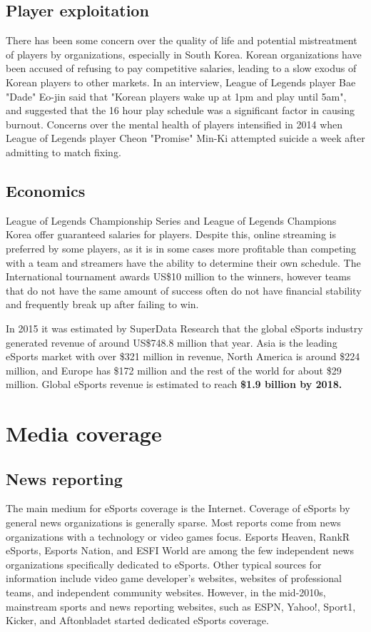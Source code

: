 	\subsection{Player exploitation}
	There has been some concern over the quality of life and potential mistreatment of players by organizations, especially in South Korea. Korean organizations have been accused of refusing to pay competitive salaries, leading to a slow exodus of Korean players to other markets. In an interview, League of Legends player Bae "Dade" Eo-jin said that "Korean players wake up at 1pm and play until 5am", and suggested that the 16 hour play schedule was a significant factor in causing burnout. Concerns over the mental health of players intensified in 2014 when League of Legends player Cheon "Promise" Min-Ki attempted suicide a week after admitting to match fixing.
	\subsection{Economics}
	League of Legends Championship Series and League of Legends Champions Korea offer guaranteed salaries for players. Despite this, online streaming is preferred by some players, as it is in some cases more profitable than competing with a team and streamers have the ability to determine their own schedule. The International tournament awards US\$10 million to the winners, however teams that do not have the same amount of success often do not have financial stability and frequently break up after failing to win.
	
	In 2015 it was estimated by SuperData Research that the global eSports industry generated revenue of around US\$748.8 million that year. Asia is the leading eSports market with over \$321 million in revenue, North America is around \$224 million, and Europe has \$172 million and the rest of the world for about \$29 million. Global eSports revenue is estimated to reach \textbf{\$1.9 billion by 2018.}
	\newpage
\section{Media coverage}
	\subsection{News reporting}
	The main medium for eSports coverage is the Internet. Coverage of eSports by general news organizations is generally sparse. Most reports come from news organizations with a technology or video games focus. Esports Heaven, RankR eSports, Esports Nation, and ESFI World are among the few independent news organizations specifically dedicated to eSports. Other typical sources for information include video game developer's websites, websites of professional teams, and independent community websites. However, in the mid-2010s, mainstream sports and news reporting websites, such as ESPN, Yahoo!, Sport1, Kicker, and Aftonbladet started dedicated eSports coverage.
